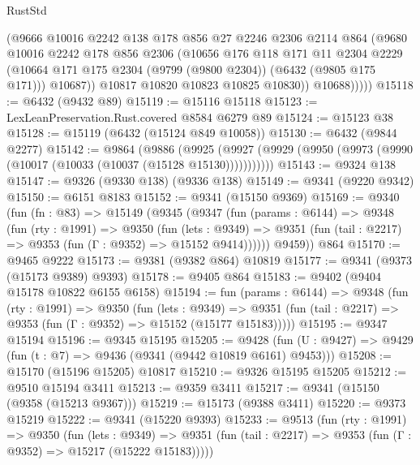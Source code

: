 \begin{lexlean}{RustStd}
\begin{coremodule}
                (@9666
                  @10016
                  @2242
                  @138
                  @178
                  @856
                  @27
                  @2246
                  @2306
                  @2114
                  @864
                  (@9680
                    @10016
                    @2242
                    @178
                    @856
                    @2306
                    (@10656
                      @176
                      @118
                      @171
                      @11
                      @2304
                      @2229
                      (@10664 @171 @175 @2304 (@9799 (@9800 @2304)) (@6432 (@9805 @175 @171)))
                      @10687))
                  @10817
                  @10820
                  @10823
                  @10825
                  @10830))
              @10688)))))
@15118 := @6432 (@9432 @89)
@15119 := @15116 @15118
@15123 := LexLeanPreservation.Rust.covered @8584 @6279 @89
@15124 := @15123 @38
@15128 := @15119 (@6432 (@15124 @849 @10058))
@15130 := @6432 (@9844 @2277)
@15142 := @9864
    (@9886
      (@9925 (@9927 (@9929 (@9950 (@9973 (@9990 (@10017 (@10033 (@10037 (@15128 @15130)))))))))))
@15143 := @9324 @138
@15147 := @9326 (@9330 @138) (@9336 @138)
@15149 := @9341 (@9220 @9342)
@15150 := @6151 @8183
@15152 := @9341 (@15150 @9369)
@15169 := @9340
    (fun (fn : @83) =>
    @15149
      (@9345
        (@9347
          (fun (params : @6144) =>
          @9348
            (fun (rty : @1991) =>
            @9350
              (fun (lets : @9349) =>
              @9351 (fun (tail : @2217) => @9353 (fun (Γ : @9352) => @15152 @9414))))))
        @9459))
    @864
@15170 := @9465 @9222
@15173 := @9381 (@9382 @864) @10819
@15177 := @9341 (@9373 (@15173 @9389) @9393)
@15178 := @9405 @864
@15183 := @9402 (@9404 @15178 @10822 @6155 @6158)
@15194 := fun (params : @6144) =>
  @9348
    (fun (rty : @1991) =>
    @9350
      (fun (lets : @9349) =>
      @9351 (fun (tail : @2217) => @9353 (fun (Γ : @9352) => @15152 (@15177 @15183)))))
@15195 := @9347 @15194
@15196 := @9345 @15195
@15205 := @9428
    (fun (U : @9427) => @9429 (fun (t : @7) => @9436 (@9341 (@9442 @10819 @6161) @9453)))
@15208 := @15170 (@15196 @15205) @10817
@15210 := @9326 @15195 @15205
@15212 := @9510 @15194 @3411
@15213 := @9359 @3411
@15217 := @9341 (@15150 (@9358 (@15213 @9367)))
@15219 := @15173 (@9388 @3411)
@15220 := @9373 @15219
@15222 := @9341 (@15220 @9393)
@15233 := @9513
    (fun (rty : @1991) =>
    @9350
      (fun (lets : @9349) =>
      @9351 (fun (tail : @2217) => @9353 (fun (Γ : @9352) => @15217 (@15222 @15183)))))

\end{coremodule}
\end{lexlean}
